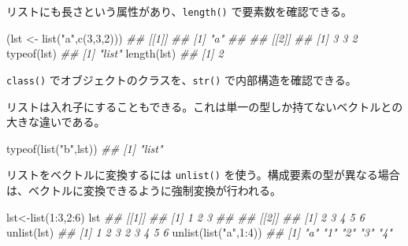 \documentclass[
  letterpaper,
  xelatex,
  ja=standard, xelatex]{bxjsbook}
\newenvironment{Shaded}{\begin{snugshade}}{\end{snugshade}}
\newcommand{\DecValTok}[1]{\textcolor[rgb]{0.68,0.00,0.00}{#1}}
\newcommand{\DocumentationTok}[1]{\textcolor[rgb]{0.37,0.37,0.37}{\textit{#1}}}
\newcommand{\FunctionTok}[1]{\textcolor[rgb]{0.28,0.35,0.67}{#1}}
\newcommand{\NormalTok}[1]{\textcolor[rgb]{0.00,0.23,0.31}{#1}}
\newcommand{\OtherTok}[1]{\textcolor[rgb]{0.00,0.23,0.31}{#1}}
\newcommand{\SpecialCharTok}[1]{\textcolor[rgb]{0.37,0.37,0.37}{#1}}
\newcommand{\StringTok}[1]{\textcolor[rgb]{0.13,0.47,0.30}{#1}}
\begin{document}
リストにも長さという属性があり、\texttt{length()} で要素数を確認できる。

\begin{Shaded}
\begin{Highlighting}[]
\NormalTok{(lst }\OtherTok{\textless{}{-}} \FunctionTok{list}\NormalTok{(}\StringTok{"a"}\NormalTok{,}\FunctionTok{c}\NormalTok{(}\DecValTok{3}\NormalTok{,}\DecValTok{3}\NormalTok{,}\DecValTok{2}\NormalTok{)))}
\DocumentationTok{\#\# [[1]]}
\DocumentationTok{\#\# [1] "a"}
\DocumentationTok{\#\# }
\DocumentationTok{\#\# [[2]]}
\DocumentationTok{\#\# [1] 3 3 2}
\FunctionTok{typeof}\NormalTok{(lst)}
\DocumentationTok{\#\# [1] "list"}
\FunctionTok{length}\NormalTok{(lst)}
\DocumentationTok{\#\# [1] 2}
\end{Highlighting}
\end{Shaded}

\texttt{class()} でオブジェクトのクラスを、\texttt{str()}
で内部構造を確認できる。

\begin{Shaded}
\end{Shaded}

リストは入れ子にすることもできる。これは単一の型しか持てないベクトルとの大きな違いである。

\begin{Shaded}
\begin{Highlighting}[]
\FunctionTok{typeof}\NormalTok{(}\FunctionTok{list}\NormalTok{(}\StringTok{"b"}\NormalTok{,lst))}
\DocumentationTok{\#\# [1] "list"}
\end{Highlighting}
\end{Shaded}

リストをベクトルに変換するには \texttt{unlist()}
を使う。構成要素の型が異なる場合は、ベクトルに変換できるように強制変換が行われる。

\begin{Shaded}
\begin{Highlighting}[]
\NormalTok{lst}\OtherTok{\textless{}{-}}\FunctionTok{list}\NormalTok{(}\DecValTok{1}\SpecialCharTok{:}\DecValTok{3}\NormalTok{,}\DecValTok{2}\SpecialCharTok{:}\DecValTok{6}\NormalTok{)}
\NormalTok{lst}
\DocumentationTok{\#\# [[1]]}
\DocumentationTok{\#\# [1] 1 2 3}
\DocumentationTok{\#\# }
\DocumentationTok{\#\# [[2]]}
\DocumentationTok{\#\# [1] 2 3 4 5 6}
\FunctionTok{unlist}\NormalTok{(lst)}
\DocumentationTok{\#\# [1] 1 2 3 2 3 4 5 6}
\FunctionTok{unlist}\NormalTok{(}\FunctionTok{list}\NormalTok{(}\StringTok{"a"}\NormalTok{,}\DecValTok{1}\SpecialCharTok{:}\DecValTok{4}\NormalTok{))}
\DocumentationTok{\#\# [1] "a" "1" "2" "3" "4"}
\end{Highlighting}
\end{Shaded}
\end{document}
